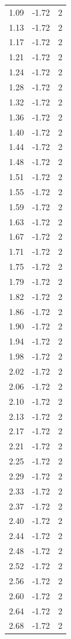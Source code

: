 \begin{longtable}{lrr}
  1.09 & -1.72 & 2 \\
  1.13 & -1.72 & 2 \\
  1.17 & -1.72 & 2 \\
  1.21 & -1.72 & 2 \\
  1.24 & -1.72 & 2 \\
  1.28 & -1.72 & 2 \\
  1.32 & -1.72 & 2 \\
  1.36 & -1.72 & 2 \\
  1.40 & -1.72 & 2 \\
  1.44 & -1.72 & 2 \\
  1.48 & -1.72 & 2 \\
  1.51 & -1.72 & 2 \\
  1.55 & -1.72 & 2 \\
  1.59 & -1.72 & 2 \\
  1.63 & -1.72 & 2 \\
  1.67 & -1.72 & 2 \\
  1.71 & -1.72 & 2 \\
  1.75 & -1.72 & 2 \\
  1.79 & -1.72 & 2 \\
  1.82 & -1.72 & 2 \\
  1.86 & -1.72 & 2 \\
  1.90 & -1.72 & 2 \\
  1.94 & -1.72 & 2 \\
  1.98 & -1.72 & 2 \\
  2.02 & -1.72 & 2 \\
  2.06 & -1.72 & 2 \\
  2.10 & -1.72 & 2 \\
  2.13 & -1.72 & 2 \\
  2.17 & -1.72 & 2 \\
  2.21 & -1.72 & 2 \\
  2.25 & -1.72 & 2 \\
  2.29 & -1.72 & 2 \\
  2.33 & -1.72 & 2 \\
  2.37 & -1.72 & 2 \\
  2.40 & -1.72 & 2 \\
  2.44 & -1.72 & 2 \\
  2.48 & -1.72 & 2 \\
  2.52 & -1.72 & 2 \\
  2.56 & -1.72 & 2 \\
  2.60 & -1.72 & 2 \\
  2.64 & -1.72 & 2 \\
  2.68 & -1.72 & 2 \\

\end{longtable}
